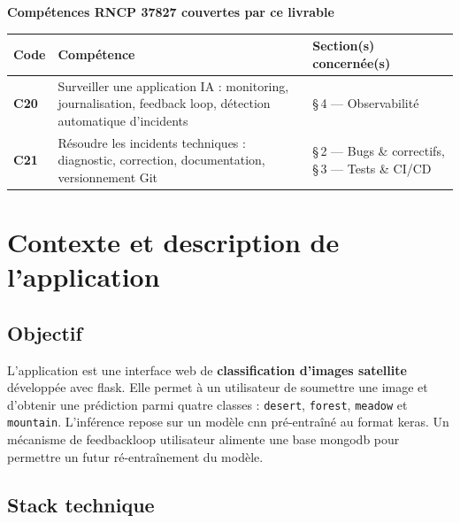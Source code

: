 \documentclass[french, a4paper, 12pt]{article}
\begin{document}
\begin{mdframed}[linewidth=1pt, linecolor=RNCPred!60, backgroundcolor=RNCPred!4,
                 innertopmargin=8pt, innerbottommargin=8pt,
                 innerleftmargin=10pt, innerrightmargin=10pt]
\small
\textbf{\color{RNCPred} Compétences RNCP 37827 couvertes par ce livrable}

\renewcommand{\arraystretch}{1.2}
\begin{tabularx}{\linewidth}{>{\bfseries}p{1.0cm} >{\raggedright}p{4.8cm} >{\raggedright\arraybackslash}X}
    \toprule
    Code & Compétence & Section(s) concernée(s) \\
    \midrule
    C20 & Surveiller une application IA : monitoring, journalisation, feedback loop, détection automatique d'incidents & §\,4 — Observabilité \\
    C21 & Résoudre les incidents techniques : diagnostic, correction, documentation, versionnement Git & §\,2 — Bugs \& correctifs, §\,3 — Tests \& CI/CD \\
    \bottomrule
\end{tabularx}
\end{mdframed}

\newpage

\section{Contexte et description de l'application}

\subsection{Objectif}

L'application est une interface web de \textbf{classification d'images satellite}
développée avec \gls{flask}. Elle permet à un utilisateur de soumettre une image et
d'obtenir une prédiction parmi quatre classes : \texttt{desert}, \texttt{forest},
\texttt{meadow} et \texttt{mountain}. L'inférence repose sur un modèle \gls{cnn}
pré-entraîné au format \gls{keras}. Un mécanisme de \gls{feedbackloop} utilisateur
alimente une base \gls{mongodb} pour permettre un futur ré-entraînement du modèle.

\subsection{Stack technique}
\end{document}
